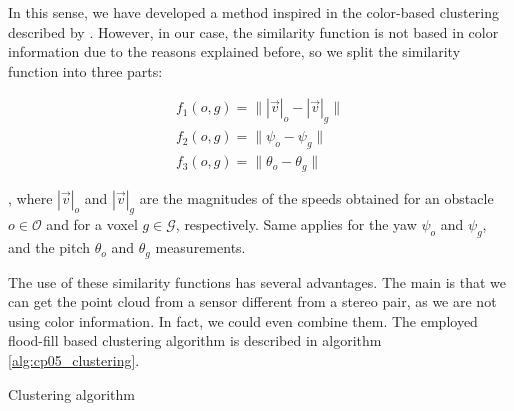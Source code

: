 In this sense, we have developed a method inspired in the color-based clustering described by \cite{broggi2013}. However, in our case, the similarity function is not based in color information due to the reasons explained before, so we split the similarity function into three parts:

\begin{equation}\label{eq:cp05_similarity_functions}
\begin{array}{l}
f_1(o,g)=\| |\vec{v}|_o - |\vec{v}|_g \|\\
f_2(o,g)=\| \psi_o - \psi_g \|\\
f_3(o,g)=\| \theta_o - \theta_g \|
\end{array}
\end{equation}

, where $|\vec{v}|_o$ and $|\vec{v}|_g$ are the magnitudes of the speeds obtained for an obstacle $o \in \mathcal{O}$ and for a voxel $g \in \mathcal{G}$, respectively. Same applies for the yaw $\psi_o$ and $\psi_g$, and the pitch $\theta_o$ and $\theta_g$ measurements.

The use of these similarity functions has several advantages. The main is that we can get the point cloud from a sensor different from a stereo pair, as we are not using color information. In fact, we could even combine them. The employed flood-fill based clustering algorithm is described in algorithm \ref{alg:cp05_clustering}.

\begin{algorithm*}[h!]
\caption{Clustering algorithm}
\label{alg:cp05_clustering}
\begin{algorithmic}
 
      \EndIf
    \EndFor
  \EndWhile
  \EndIf
\EndFor
\EndFunction
\end{algorithmic}
\end{algorithm*}

